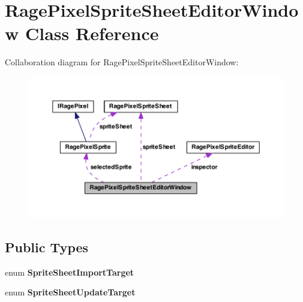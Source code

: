 \hypertarget{class_rage_pixel_sprite_sheet_editor_window}{\section{Rage\-Pixel\-Sprite\-Sheet\-Editor\-Window Class Reference}
\label{class_rage_pixel_sprite_sheet_editor_window}
}


Collaboration diagram for Rage\-Pixel\-Sprite\-Sheet\-Editor\-Window\-:
\nopagebreak
\begin{figure}[H]
\begin{center}
\leavevmode
\includegraphics[width=350pt]{class_rage_pixel_sprite_sheet_editor_window__coll__graph}
\end{center}
\end{figure}
\subsection*{Public Types}
\begin{DoxyCompactItemize}
\item 
enum {\bfseries Sprite\-Sheet\-Import\-Target} 
\item 
enum {\bfseries Sprite\-Sheet\-Update\-Target} 
\end{DoxyCompactItemize}
